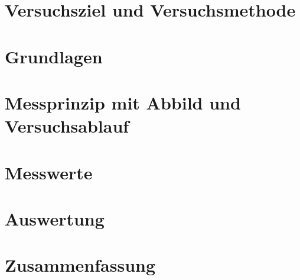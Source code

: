 \documentclass[
12pt,
a4paper,
bibliography=totocnumbered, %
BCOR=1cm, %
oneside, %
]{scrartcl}
\begin{document}
\thispagestyle{empty}



\thispagestyle{empty}

\tableofcontents

\clearpage %

\renewcommand{\thepage}{\arabic{page}}
\setcounter{page}{1}

\section[Versuchsziel]{Versuchsziel und Versuchsmethode}

\section{Grundlagen}

\section[Messprinzip]{Messprinzip mit Abbild und Versuchsablauf}


\section{Messwerte}


\section{Auswertung}

\section{Zusammenfassung}
\end{document}
